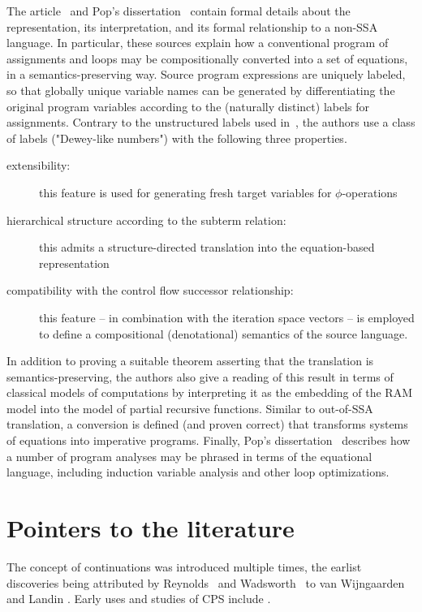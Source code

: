 The article~\cite{PopJS2007} and Pop's
dissertation~\cite{PopDissertation} contain formal details about the
representation, its interpretation, and its formal relationship to a
non-SSA language. In particular, these sources explain how a
conventional program of assignments and loops may be compositionally
converted into a set of equations, in a semantics-preserving
way. Source program expressions are uniquely labeled, so that globally
unique variable names can be generated by differentiating the original
program variables according to the (naturally distinct) labels for
assignments.  Contrary to the unstructured labels used
in~\cite{NielsonNielsonHanking:POPA}, the authors use a class of
labels ("Dewey-like numbers") with the following three properties.
\begin{description}
\item[extensibility:] this feature
is used for generating fresh target variables for $\phi$-operations
\item[hierarchical structure according to the subterm relation:]
   this admits a structure-directed translation into the
   equation-based representation
\item [compatibility with the control flow successor relationship:] 
  this feature -- in combination
with the iteration space vectors -- is employed to define a compositional
(denotational) semantics of the source language. 
\end{description}
In addition to proving a suitable theorem asserting that the
translation is semantics-preserving, the authors also give a reading
of this result in terms of classical models of computations by
interpreting it as the embedding of the RAM model into the model of
partial recursive functions. Similar to out-of-SSA translation, a
conversion is defined (and proven correct) that transforms systems of
equations into imperative programs. Finally, Pop's
dissertation~\cite{PopDissertation} describes how a number of program
analyses may be phrased in terms of the equational language, including
induction variable analysis and other loop optimizations.


\section{Pointers to the literature}
\label{section:Part1:Semantics:Discussion}

The concept of continuations was introduced multiple times, the
earlist discoveries being attributed by
Reynolds~\cite{Reynolds:LSC1993} and Wadsworth~\cite{Wadsworth00} to
van Wijngaarden
\cite{vanWijngaarden1966} and Landin \cite{Landin1965}. Early uses
and studies of CPS include \cite{Reynolds:1972,Plotkin75}.  

